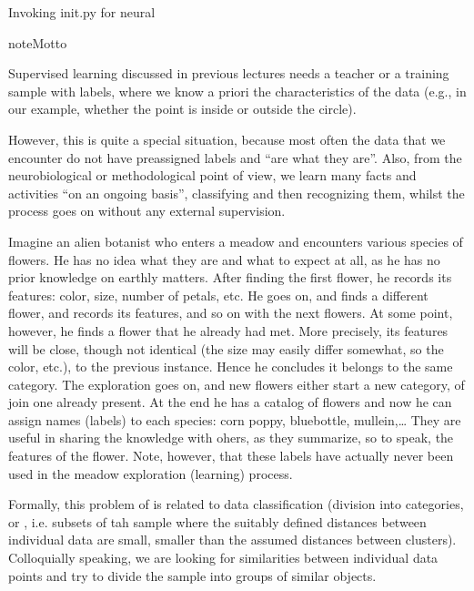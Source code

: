 \documentclass[letterpaper,10pt,english]{jupyterBook}
\begin{document}
\begin{sphinxVerbatim}[commandchars=\\\{\}]
Invoking \PYGZus{}\PYGZus{}init\PYGZus{}\PYGZus{}.py for neural
\end{sphinxVerbatim}

\begin{sphinxadmonition}{note}{Motto}

\sphinxAtStartPar
{}


\end{sphinxadmonition}

\sphinxAtStartPar
Supervised learning discussed in previous lectures needs a teacher or a training sample with labels, where we know a priori the characteristics of the data (e.g., in our example, whether the point is inside or outside the circle).

\sphinxAtStartPar
However, this is quite a special situation, because most often the data that we encounter do not have pre\sphinxhyphen{}assigned labels and “are what they are”. Also, from the neurobiological or methodological point of view, we learn many facts and activities “on an ongoing basis”, classifying and then recognizing them, whilst the process goes on without any external supervision.

\sphinxAtStartPar
Imagine an alien botanist who enters a meadow and encounters various species of flowers. He has no idea what they are and what to expect at all, as he has no prior knowledge on earthly matters. After finding the first flower, he records its features: color, size, number of petals, etc. He goes on, and finds a different flower, and records its features, and so on with the next flowers. At some point, however, he finds a flower that he already had met. More precisely, its features will be close, though not identical (the size may easily differ somewhat, so the color, etc.), to the previous instance. Hence he concludes it belongs to the same category. The exploration goes on, and new flowers either start a new category, of join one already present. At the end he has a catalog of flowers and now he can assign names (labels) to each species: corn poppy, bluebottle, mullein,…  They are useful in sharing the knowledge with ohers, as they summarize, so to speak, the features of the flower. Note, however, that these labels have actually never been used in the meadow exploration (learning) process.

\sphinxAtStartPar
Formally, this problem of  is related to data classification (division into categories, or , i.e. subsets of tah sample where the suitably defined distances between individual data are small, smaller than the assumed distances between clusters). Colloquially speaking, we are looking for similarities between individual data points and try to divide the sample into groups of similar objects.
\end{document}
